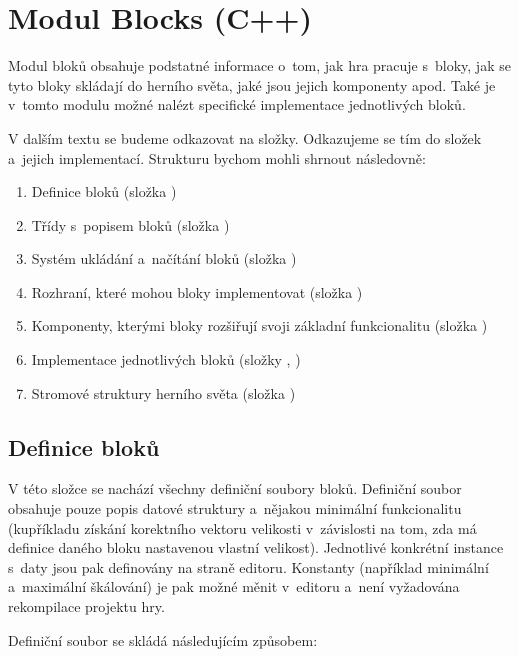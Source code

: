 
\section{Modul Blocks (C++)}

Modul bloků obsahuje podstatné informace o~tom, jak hra pracuje s~bloky, jak se tyto bloky skládají do herního světa, jaké jsou jejich komponenty apod. Také je v~tomto modulu možné nalézt specifické implementace jednotlivých bloků.

V dalším textu se budeme odkazovat na složky. Odkazujeme se tím do složek  a~jejich   implementací. Strukturu bychom mohli shrnout následovně:

\begin{enumerate}
	\item Definice bloků (složka )
	\item Třídy s~popisem bloků (složka )
	\item Systém ukládání a~načítání bloků (složka  )
	\item Rozhraní, které mohou bloky implementovat (složka )
	\item Komponenty, kterými bloky rozšiřují svoji základní funkcionalitu (složka )
	\item Implementace jednotlivých bloků (složky , )
	\item Stromové struktury herního světa (složka )
\end{enumerate}
 

\subsection{Definice bloků}
V této složce se nachází všechny definiční soubory bloků. Definiční soubor obsahuje pouze popis datové struktury a~nějakou minimální funkcionalitu (kupříkladu získání korektního vektoru velikosti v~závislosti na tom, zda má definice daného bloku nastavenou vlastní velikost). Jednotlivé konkrétní instance s~daty jsou pak definovány na straně editoru. Konstanty (například minimální a~maximální škálování) je pak možné měnit v~editoru a~není vyžadována rekompilace projektu hry. 

Definiční soubor se skládá následujícím způsobem:

